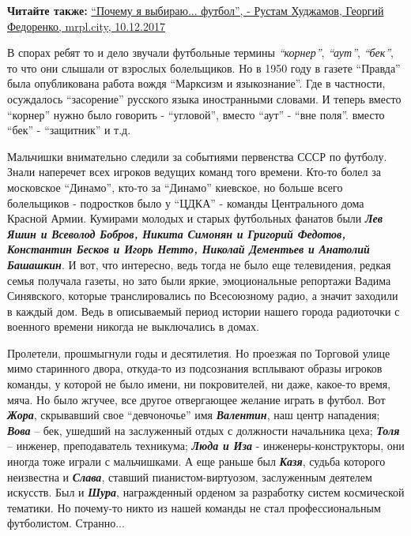 \textbf{Читайте также:} \href{https://mrpl.city/blogs/view/pochemu-ya-vybirayu-futbolrustam-hudzhamov}{%
\enquote{Почему я выбираю... футбол}, - Рустам Худжамов, Георгий Федоренко, mrpl.city, 10.12.2017}

В спорах ребят то и дело звучали футбольные термины \emph{\enquote{корнер}}, \emph{\enquote{аут}}, \emph{\enquote{бек}}, то
что они слышали от взрослых болельщиков. Но в 1950 году в газете \enquote{Правда} была
опубликована работа вождя \enquote{Марксизм и языкознание}. Где в частности, осуждалось
\enquote{засорение} русского языка иностранными словами. И теперь вместо \enquote{корнер} нужно
было говорить - \enquote{угловой}, вместо \enquote{аут} - \enquote{вне поля}. вместо \enquote{бек} - \enquote{защитник}
и т.д.

Мальчишки внимательно следили за событиями первенства СССР по футболу. Знали
наперечет всех игроков ведущих команд того времени. Кто-то болел за московское
\enquote{Динамо}, кто-то за \enquote{Динамо} киевское, но больше всего болельщиков - подростков
было у \enquote{ЦДКА} - команды Центрального дома Красной Армии. Кумирами молодых и
старых футбольных фанатов были {\em\bfseries Лев Яшин и Всеволод Бобров, Никита Симонян и
Григорий Федотов, Константин Бесков и Игорь Нетто, Николай Дементьев и Анатолий
Башашкин}. И вот, что интересно, ведь тогда не было еще телевидения, редкая
семья получала газеты, но зато были яркие, эмоциональные репортажи Вадима
Синявского, которые транслировались по Всесоюзному радио, а значит заходили в
каждый дом. Ведь в описываемый период истории нашего города радиоточки с
военного времени никогда не выключались в домах.

Пролетели, прошмыгнули годы и десятилетия. Но проезжая по Торговой улице мимо
старинного двора, откуда-то из подсознания всплывают образы игроков команды, у
которой не было имени, ни покровителей, ни даже, какое-то время, мяча. Но было
жгучее, все другое отвергающее желание играть в футбол. Вот \emph{\textbf{Жора}}, скрывавший
свое \enquote{девчоночье} имя \emph{\textbf{Валентин}}, наш центр нападения; \emph{\textbf{Вова}} – бек, ушедший на
заслуженный отдых с должности начальника цеха; \emph{\textbf{Толя}} – инженер, преподаватель
техникума; \emph{\textbf{Люда и Иза}} - инженеры-конструкторы, они иногда тоже играли с
мальчишками. А еще раньше был \textbf{\emph{Казя}}, судьба которого неизвестна и \emph{\textbf{Слава}}, ставший
пианистом-виртуозом, заслуженным деятелем искусств. Был и \textbf{\emph{Шура}}, награжденный
орденом за разработку систем космической тематики. Но почему-то никто из нашей
команды не стал профессиональным футболистом. Странно...
